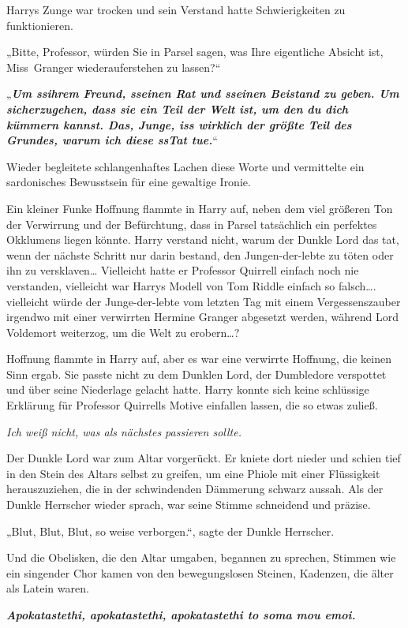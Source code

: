 {Harrys Zunge war trocken und sein Verstand hatte Schwierigkeiten zu funktionieren.

„Bitte, Professor, würden Sie in Parsel sagen, was Ihre eigentliche Absicht ist, Miss~Granger wiederauferstehen zu lassen?“

„\textbf{\emph{Um ssihrem Freund, sseinen Rat und sseinen Beistand zu geben. Um sicherzugehen, dass sie ein Teil der Welt ist, um den du dich kümmern kannst. Das, Junge, iss wirklich der größte Teil des Grundes, warum ich diese ssTat tue.}}“

Wieder begleitete schlangenhaftes Lachen diese Worte und vermittelte ein sardonisches Bewusstsein für eine gewaltige Ironie.

Ein kleiner Funke Hoffnung flammte in Harry auf, neben dem viel größeren Ton der Verwirrung und der Befürchtung, dass in Parsel tatsächlich ein perfektes Okklumens liegen könnte. Harry verstand nicht, warum der Dunkle Lord das tat, wenn der nächste Schritt nur darin bestand, den Jungen-der-lebte zu töten oder ihn zu versklaven… Vielleicht hatte er Professor Quirrell einfach noch nie verstanden, vielleicht war Harrys Modell von Tom Riddle einfach so falsch…. vielleicht würde der Junge-der-lebte vom letzten Tag mit einem Vergessenszauber irgendwo mit einer verwirrten Hermine Granger abgesetzt werden, während Lord Voldemort weiterzog, um die Welt zu erobern…?

Hoffnung flammte in Harry auf, aber es war eine verwirrte Hoffnung, die keinen Sinn ergab. Sie passte nicht zu dem Dunklen Lord, der Dumbledore verspottet und über seine Niederlage gelacht hatte. Harry konnte sich keine schlüssige Erklärung für Professor Quirrells Motive einfallen lassen, die so etwas zuließ.

\emph{Ich weiß nicht, was als nächstes passieren sollte.}

Der Dunkle Lord war zum Altar vorgerückt. Er kniete dort nieder und schien tief in den Stein des Altars selbst zu greifen, um eine Phiole mit einer Flüssigkeit herauszuziehen, die in der schwindenden Dämmerung schwarz aussah. Als der Dunkle Herrscher wieder sprach, war seine Stimme schneidend und präzise.

„Blut, Blut, Blut, so weise verborgen.“, sagte der Dunkle Herrscher.

Und die Obelisken, die den Altar umgaben, begannen zu sprechen, Stimmen wie ein singender Chor kamen von den bewegungslosen Steinen, Kadenzen, die älter als Latein waren.

\textbf{\emph{\hfill\break Apokatastethi, apokatastethi, apokatastethi to soma mou emoi.}}

}
